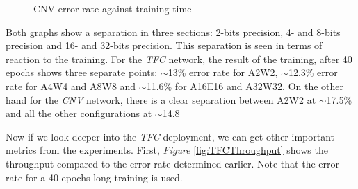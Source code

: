 \begin{figure}[htbp]
\centering
{}
\caption[CNV Error Rate]{CNV error rate against training time}
  \label{fig:CNVErrorRate}
\end{figure}

Both graphs show a separation in three sections: 2-bits precision, 4- and 8-bits precision and 16- and 32-bits precision. This separation is seen in terms of reaction to the training. For the \emph{TFC} network, the result of the training, after 40 epochs shows three separate points: $\sim$13\% error rate for A2W2, $\sim$12.3\% error rate for A4W4 and A8W8 and $\sim$11.6\% for A16E16 and A32W32. On the other hand for the \emph{CNV} network, there is a clear separation between A2W2 at $\sim$17.5\% and all the other configurations at $\sim$14.8%

Now if we look deeper into the \emph{TFC} deployment, we can get other important metrics from the experiments. First, \emph{Figure} \ref{fig:TFCThroughput} shows the throughput compared to the error rate determined earlier. Note that the error rate for a 40-epochs long training is used.

